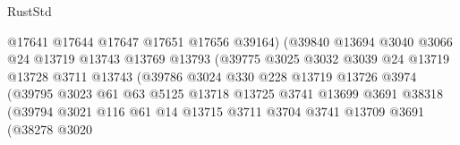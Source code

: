 \begin{lexlean}{RustStd}
\begin{coremodule}
                                      @17641
                                      @17644
                                      @17647
                                      @17651
                                      @17656
                                      @39164)
                                    (@39840
                                      @13694
                                      @3040
                                      @3066
                                      @24
                                      @13719
                                      @13743
                                      @13769
                                      @13793
                                      (@39775
                                        @3025
                                        @3032
                                        @3039
                                        @24
                                        @13719
                                        @13728
                                        @3711
                                        @13743
                                        (@39786
                                          @3024
                                          @330
                                          @228
                                          @13719
                                          @13726
                                          @3974
                                          (@39795
                                            @3023
                                            @61
                                            @63
                                            @5125
                                            @13718
                                            @13725
                                            @3741
                                            @13699
                                            @3691
                                            @38318
                                            (@39794
                                              @3021
                                              @116
                                              @61
                                              @14
                                              @13715
                                              @3711
                                              @3704
                                              @3741
                                              @13709
                                              @3691
                                              (@38278
                                                @3020

\end{coremodule}
\end{lexlean}
